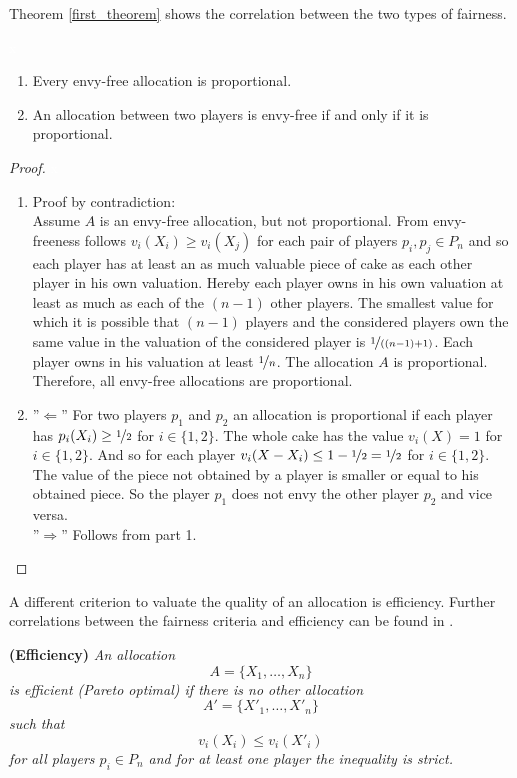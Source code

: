 Theorem \ref{first_theorem} shows the correlation between the two types of fairness.
%
\begin{lem}
\label{first_theorem}
\textcolor{white}{x}
\begin{enumerate}
\item Every envy-free allocation is proportional.
\item An allocation between two players is envy-free if and only if it is proportional.
\end{enumerate}
\end{lem}
\begin{proof}
\textcolor{white}{x}
\begin{enumerate}
\item Proof by contradiction:\\ Assume $A$ is an envy-free allocation, but not proportional. From envy-freeness follows $v_i(X_i) \geq v_i(X_j)$ for each pair of players $p_i, p_j \in P_n$ and so each player has at least an as much valuable piece of cake as each other player in his own valuation. Hereby each player owns in his own valuation at least as much as each of the $(n-1)$ other players. The smallest value for which it is possible that $(n-1)$ players and the considered players own the same value in the valuation of the considered player is $\nicefrac{1}{((n-1)+1)}$. Each player owns in his valuation at least $\nicefrac{1}{n}$. \blitza The allocation $A$ is proportional. %
\\Therefore, all envy-free allocations are proportional.
\item ''$\Leftarrow$'' For two players $p_1$ and $p_2$ an allocation is proportional if each player has $p_i(X_i) \geq \nicefrac{1}{2}$ for $i \in \{1,2\}$. The whole cake has the value $v_i(X)=1$ for $i \in \{1,2\}$. And so for each player $v_i(X-X_i) \leq 1- \nicefrac{1}{2} = \nicefrac{1}{2}$  for $i \in \{1,2\}$. The value of the piece not obtained by a player is smaller or equal to his obtained piece. So the player $p_1$ does not envy the other player $p_2$ and vice versa.\\ ''$\Rightarrow$'' Follows from part 1.\\
\end{enumerate}
\end{proof}
A different criterion to valuate the quality of an allocation is efficiency. Further correlations between the fairness criteria and efficiency can be found in \cite{eff}. 
\begin{defi}{\textbf{(Efficiency)}}
\newline \emph{An allocation \[A=\{X_1,\dots, X_n\}\] is \emph{efficient (Pareto optimal)} if there is no other allocation \[A'=\{X'_1,\dots, X'_n\}\] such that \[v_i(X_i)\leq v_i(X'_i)\] for all players $p_i \in P_n$ and for at least one player the inequality is strict.}
\end{defi}
